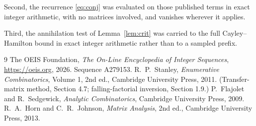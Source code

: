 \documentclass[11pt,a4paper]{article}
\theoremstyle{plain}
\theoremstyle{definition}
\begin{document}
Second, the recurrence \eqref{eq:conj} was evaluated on those published terms in exact
integer arithmetic, with no matrices involved, and vanishes wherever it applies.

Third, the annihilation test of Lemma~\ref{lem:crit} was carried to the full
Cayley--Hamilton bound in exact integer arithmetic rather than to a sampled prefix.

\begin{thebibliography}{9}
 The OEIS Foundation, \emph{The On-Line Encyclopedia of Integer
Sequences}, \url{https://oeis.org}, 2026. Sequence A279153.
 R.~P.~Stanley, \emph{Enumerative Combinatorics}, Volume 1, 2nd ed.,
Cambridge University Press, 2011. (Transfer-matrix method, Section 4.7; falling-factorial
inversion, Section 1.9.)
 P.~Flajolet and R.~Sedgewick, \emph{Analytic Combinatorics}, Cambridge
University Press, 2009.
 R.~A.~Horn and C.~R.~Johnson, \emph{Matrix Analysis}, 2nd ed., Cambridge
University Press, 2013.
\end{thebibliography}
\end{document}
